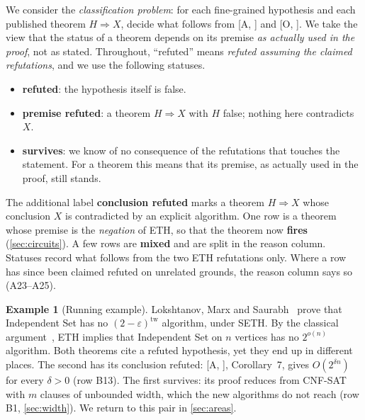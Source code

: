 \documentclass[10pt]{amsart}
\theoremstyle{plain}
\theoremstyle{definition}
\newtheorem{example}[theorem]{Example}
\theoremstyle{remark}
\numberwithin{equation}{section}
\newcommand{\A}[1][]{\textup{[A\if\relax\detokenize{#1}\relax\else, #1\fi]}}
\newcommand{\Oa}[1][]{\textup{[O\if\relax\detokenize{#1}\relax\else, #1\fi]}}
\begin{document}
We consider the \emph{classification problem}: for each fine-grained hypothesis and each published
theorem $H\Rightarrow X$, decide what follows from \A{} and \Oa. We take the view that the status of
a theorem depends on its premise \emph{as actually used in the proof}, not as stated. Throughout,
``refuted'' means \emph{refuted assuming the claimed refutations}, and we use the following
statuses.\label{sec:statuses}
\begin{itemize}
\item \textbf{refuted}: the hypothesis itself is false.
\item \textbf{premise refuted}: a theorem $H\Rightarrow X$ with $H$ false; nothing here contradicts $X$.
\item \textbf{survives}: we know of no consequence of the refutations that touches the statement.
For a theorem this means that its premise, as actually used in the proof, still stands.
\end{itemize}
The additional label \textbf{conclusion refuted} marks a theorem $H\Rightarrow X$ whose conclusion
$X$ is contradicted by an explicit algorithm. One row is a theorem whose premise is the
\emph{negation} of ETH, so that the theorem now \textbf{fires} (\cref{sec:circuits}). A few rows
are \textbf{mixed} and are split in the reason column. Statuses record what follows from the two
ETH refutations only. Where a row has since been claimed refuted on unrelated grounds, the reason
column says so (A23--A25).

\begin{example}[Running example]\label{ex:running}
Lokshtanov, Marx and Saurabh~\cite{LMS11tw} prove that Independent Set has no $(2-\varepsilon)^{\mathrm{tw}}$
algorithm, under SETH. By the classical argument~\cite{IPZ01,LMS11}, ETH implies that Independent
Set on $n$ vertices has no $2^{o(n)}$ algorithm. Both theorems cite a refuted hypothesis, yet they
end up in different places. The second has its conclusion refuted: \A, Corollary~7, gives
$O(2^{\delta n})$ for every $\delta>0$ (row B13). The first survives: its proof reduces from
CNF-SAT with $m$ clauses of unbounded width, which the new algorithms do not reach (row B1,
\cref{sec:width}). We return to this pair in \cref{sec:areas}.
\end{example}
\end{document}
